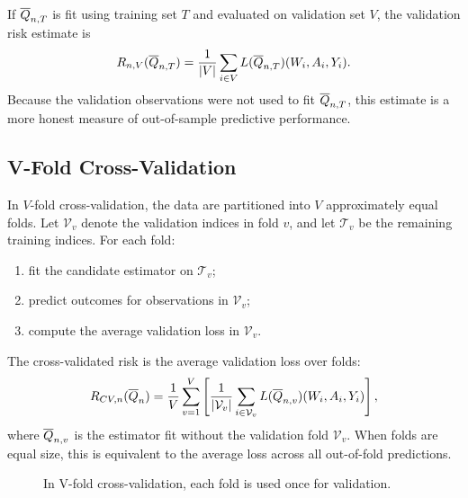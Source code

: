 If $\overline{Q}_{n,T}$ is fit using training set $T$ and evaluated on validation set $V$, the
validation risk estimate is
\[
R_{n,V}(\overline{Q}_{n,T})
=
\frac{1}{|V|}\sum_{i\in V}
L(\overline{Q}_{n,T})(W_i,A_i,Y_i).
\]
Because the validation observations were not used to fit $\overline{Q}_{n,T}$, this estimate
is a more honest measure of out-of-sample predictive performance.

\subsection{V-Fold Cross-Validation}

In $V$-fold cross-validation, the data are partitioned into $V$ approximately equal
folds. Let $\mathcal V_v$ denote the validation indices in fold $v$, and let
$\mathcal T_v$ be the remaining training indices. For each fold:
\begin{enumerate}
\item fit the candidate estimator on $\mathcal T_v$;
\item predict outcomes for observations in $\mathcal V_v$;
\item compute the average validation loss in $\mathcal V_v$.
\end{enumerate}

The cross-validated risk is the average validation loss over folds:
\[
R_{CV,n}(\overline{Q}_n)
=
\frac{1}{V}\sum_{v=1}^V
\left[
\frac{1}{|\mathcal V_v|}
\sum_{i\in\mathcal V_v}
L(\overline{Q}_{n,v})(W_i,A_i,Y_i)
\right],
\]
where $\overline{Q}_{n,v}$ is the estimator fit without the validation fold $\mathcal V_v$.
When folds are equal size, this is equivalent to the average loss across all
out-of-fold predictions.

\begin{figure}[H]
\centering
{}
\caption{In V-fold cross-validation, each fold is used once for validation.}
\label{fig:ch5-vfold}
\end{figure}

